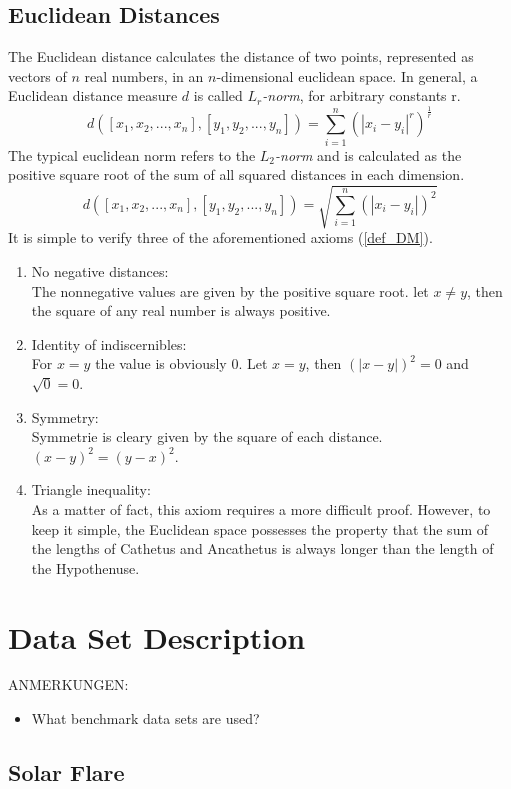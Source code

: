 \documentclass[12pt]%
{article}
\begin{document}
\subsection{Euclidean Distances}
The Euclidean distance calculates the distance of two points, represented as vectors of $n$ real numbers, in an $n$-dimensional euclidean space. In general, a Euclidean distance measure $d$ is called $L_r$\textit{-norm}, for arbitrary constants r. 
$$d([x_1,x_2,...,x_n], [y_1,y_2,...,y_n])=\sum_{i=1}^{n}(|x_i-y_i|^r)^\frac{1}{r}$$
The typical euclidean norm refers to the $L_2$\textit{-norm} and is calculated as the positive square root of the sum of all squared distances in each dimension.
$$d([x_1,x_2,...,x_n], [y_1,y_2,...,y_n])=\sqrt{\sum_{i=1}^{n}(|x_i-y_i|)^2}$$
It is simple to verify three of the aforementioned axioms (\ref{def_DM}).
\begin{enumerate}
\item No negative distances:\\
The nonnegative values are given by the positive square root. let $x \neq y$, then the square of any real number is always positive.
\item Identity of indiscernibles:\\
For $x = y$ the value is obviously $0$. Let $x = y$, then $(|x - y|)^2 = 0$ and $\sqrt{0} = 0$.
\item Symmetry: \\
Symmetrie is cleary given by the square of each distance.\\
$(x - y)^2 = (y - x)^2$.
\item Triangle inequality: \\
As a matter of fact, this axiom requires a more difficult proof. However, to keep it simple, the Euclidean space possesses the property that the sum of the lengths of Cathetus and Ancathetus is always longer than the length of the Hypothenuse. \cite{MMDS}
\end{enumerate}

\section{Data Set Description}
ANMERKUNGEN:
\begin{itemize}
\item What benchmark data sets are used?
\end{itemize}
\subsection{Solar Flare}

\end{document}
